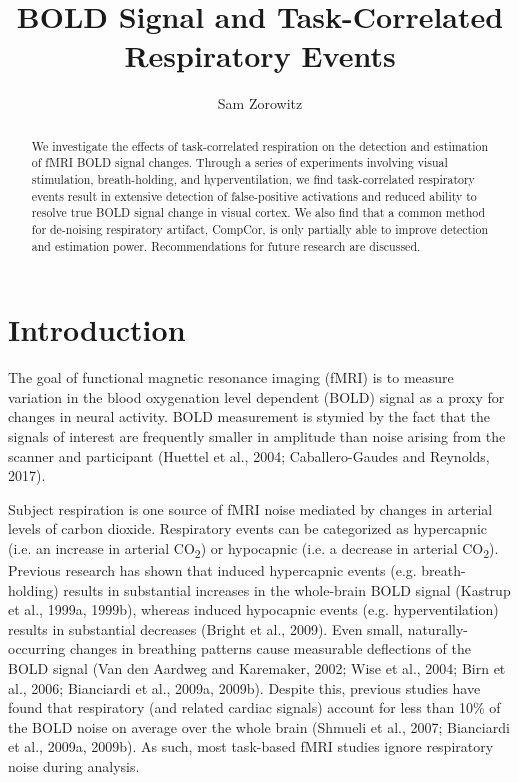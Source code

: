 \documentclass[9pt]{NEU502b-fmri}
\title{BOLD Signal and Task-Correlated Respiratory Events}
\author[1]{Sam Zorowitz}
\begin{document}
\maketitle

\begin{abstract}
We investigate the effects of task-correlated respiration on the detection and estimation of fMRI BOLD signal changes. Through a series of experiments involving visual stimulation, breath-holding, and hyperventilation, we find task-correlated respiratory events result in extensive detection of false-positive activations and reduced ability to resolve true BOLD signal change in visual cortex. We also find that a common method for de-noising respiratory artifact, CompCor, is only partially able to improve detection and estimation power. Recommendations for future research are discussed.
\end{abstract}

\section{Introduction}

The goal of functional magnetic resonance imaging (fMRI) is to measure variation in the blood oxygenation level dependent (BOLD) signal as a proxy for changes in neural activity. BOLD measurement is stymied by the fact that the signals of interest are frequently smaller in amplitude than noise arising from the scanner and participant (Huettel et al., 2004; Caballero-Gaudes and Reynolds, 2017). 

Subject respiration is one source of fMRI noise mediated by changes in arterial levels of carbon dioxide. Respiratory events can be categorized as hypercapnic (i.e. an increase in arterial CO\textsubscript{2}) or hypocapnic (i.e. a decrease in arterial CO\textsubscript{2}). Previous research has shown that induced hypercapnic events (e.g. breath-holding) results in substantial increases in the whole-brain BOLD signal (Kastrup et al., 1999a, 1999b), whereas induced hypocapnic events (e.g. hyperventilation) results in substantial decreases (Bright et al., 2009). Even small, naturally-occurring changes in breathing patterns cause measurable deflections of the BOLD signal (Van den Aardweg and Karemaker, 2002; Wise et al., 2004; Birn et al., 2006; Bianciardi et al., 2009a, 2009b). Despite this, previous studies have found that respiratory (and related cardiac signals) account for less than 10\% of the BOLD noise on average over the whole brain (Shmueli et al., 2007; Bianciardi et al., 2009a, 2009b). As such, most task-based fMRI studies ignore respiratory noise during analysis.
\end{document}
